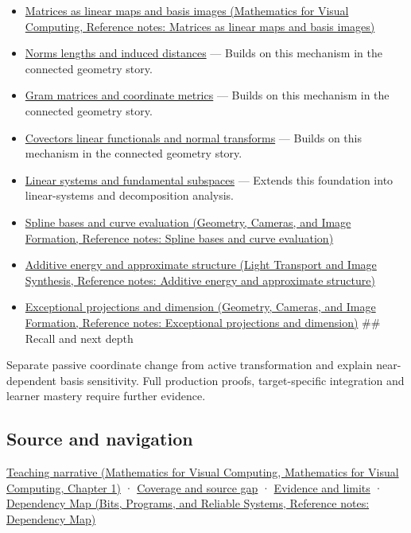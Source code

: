 \begin{itemize}
\item
  \href{../02-Mathematics-for-Visual-Computing/main.pdf\#nameddest=appendix-bd39c3bf5d64}{Matrices as linear maps and basis images (Mathematics for Visual Computing, Reference notes: Matrices as linear maps and basis images)}
\item
  \hyperref[appendix-49933872bb51]{Norms lengths and induced distances} --- Builds on this mechanism in the connected geometry story.
\item
  \hyperref[appendix-3b863809f82a]{Gram matrices and coordinate metrics} --- Builds on this mechanism in the connected geometry story.
\item
  \hyperref[appendix-46da295c6787]{Covectors linear functionals and normal transforms} --- Builds on this mechanism in the connected geometry story.
\item
  \hyperref[appendix-8572a4a060c1]{Linear systems and fundamental subspaces} --- Extends this foundation into linear-systems and decomposition analysis.
\item
  \href{../03-Geometry-Cameras-and-Image-Formation/main.pdf\#nameddest=appendix-f28eeec97a3d}{Spline bases and curve evaluation (Geometry, Cameras, and Image Formation, Reference notes: Spline bases and curve evaluation)}
\item
  \href{../04-Light-Transport-and-Image-Synthesis/main.pdf\#nameddest=appendix-b0732b22e7d6}{Additive energy and approximate structure (Light Transport and Image Synthesis, Reference notes: Additive energy and approximate structure)}
\item
  \href{../03-Geometry-Cameras-and-Image-Formation/main.pdf\#nameddest=appendix-3c73f7862157}{Exceptional projections and dimension (Geometry, Cameras, and Image Formation, Reference notes: Exceptional projections and dimension)} \#\# Recall and next depth
\end{itemize}

Separate passive coordinate change from active transformation and explain near-dependent basis sensitivity. Full production proofs, target-specific integration and learner mastery require further evidence.

\subsection{Source and navigation}\label{appendix-ce0341f7ea0d-source-and-navigation}

\href{../02-Mathematics-for-Visual-Computing/main.pdf\#nameddest=01-foundations-i-ch017-a-basis-is-a-measuring-arrangement-not-the-vector-itself}{Teaching narrative (Mathematics for Visual Computing, Mathematics for Visual Computing, Chapter 1)} · \hyperref[appendix-fd090d982a15-phase-6---parts-501-600]{Coverage and source gap} · \hyperref[appendix-a103e7846d21-phase-6---source-analysis-and-verification]{Evidence and limits} · \href{../01-Bits-Programs-and-Reliable-Systems/main.pdf\#nameddest=appendix-4ad47bdd269a}{Dependency Map (Bits, Programs, and Reliable Systems, Reference notes: Dependency Map)}
